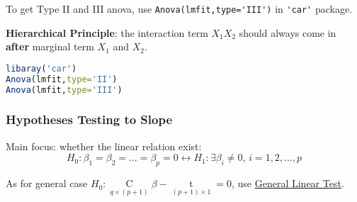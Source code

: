     To get Type II and III anova, use \lstinline|Anova(lmfit,type='III')| in \lstinline|'car'| package.

    \textbf{Hierarchical Principle}: the interaction term $ X_1X_2 $ should always come in \textbf{after}  marginal term $ X_1 $ and $ X_2 $.  

\begin{rcode}
\begin{lstlisting}[language=R]
libaray('car')
Anova(lmfit,type='II')
Anova(lmfit,type='III')
\end{lstlisting}
\end{rcode}






\subsubsection{Hypotheses Testing to Slope}
    Main focus: whether the linear relation exist:
\begin{equation}
    H_0:\beta _1=\beta _2=\ldots=\beta _p=0\longleftrightarrow H_1:\exists \beta _i\neq 0,\, i=1,2,\ldots,p
\end{equation}

    As for general case $ H_0:\mathop{C}\limits_{q\times (p+1)} \beta -\mathop{t}\limits_{(p+1)\times 1}  = 0$, use \hyperlink{HyperlinkGLT}{General Linear Test}.

